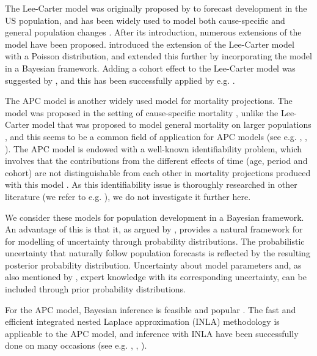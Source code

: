 \newpar The Lee-Carter model was originally proposed by \textcite{LeeCarter1992} to forecast development in the US population, and has been widely used to model both cause-specific and general population changes \parencite{GirosiKing2007}. After its introduction, numerous extensions of the model have been proposed. \textcite{BROUHNS2002373} introduced the extension of the Lee-Carter model with a Poisson distribution, and \textcite{CZADO2005260} extended this further by incorporating the model in a Bayesian framework. Adding a cohort effect to the Lee-Carter model was suggested by \textcite{RENSHAW2006556}, and this has been successfully applied by e.g. \textcite{Wisniowski2015}.

\newpar The APC model \parencite{Clayton1987} is another widely used model for mortality projections. The model was proposed in the setting of cause-specific mortality \parencite{Clayton1987}, unlike the Lee-Carter model that was proposed to model general mortality on larger populations \parencite{LeeCarter1992}, and this seems to be a common field of application for APC models (see e.g. \textcite{rieblerHeld2010}, \textcite{RieblerHeldRue2012}, \textcite{rieblerSwissSuicide2012}). The APC model is endowed with a well-known identifiability problem, which involves that the contributions from the different effects of time (age, period and cohort) are not distinguishable from each other in mortality projections produced with this model \parencite{RieblerThesis2010, RieblerHeldRue2012}. As this identifiability issue is thoroughly researched in other literature (we refer to e.g. \textcite{RieblerThesis2010}), we do not investigate it further here. 

\newpar We consider these models for population development in a Bayesian framework. An advantage of this is that it, as argued by \textcite{Wisniowski2015}, provides a natural framework for for modelling of uncertainty through probability distributions. The probabilistic uncertainty that naturally follow population forecasts is reflected by the resulting posterior probability distribution. Uncertainty about model parameters and, as also mentioned by \textcite{Wisniowski2015}, expert knowledge with its corresponding uncertainty, can be included through prior probability distributions.

\newpar For the APC model, Bayesian inference is feasible and popular \parencite{RieblerHeldRue2012}. The fast and efficient integrated nested Laplace approximation (INLA) methodology \parencite{rue2009inla} is applicable to the APC model, and inference with INLA have been successfully done on many occasions (see e.g. \textcite{RieblerThesis2010}, \textcite{RieblerHeldRue2012}, \textcite{rieblerSwissSuicide2012}). 

